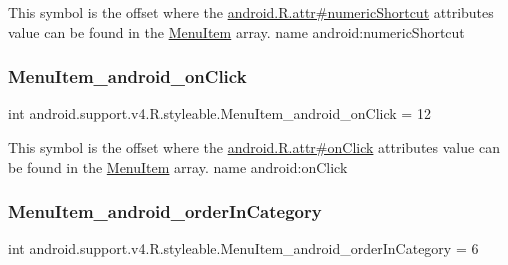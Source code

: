 This symbol is the offset where the \hyperlink{}{android.\+R.\+attr\#numeric\+Shortcut} attribute\textquotesingle{}s value can be found in the \hyperlink{classandroid_1_1support_1_1v4_1_1R_1_1styleable_a4234e016636b99c0c3d9cfc512903697}{Menu\+Item} array.  name android\+:numeric\+Shortcut \mbox{\label{classandroid_1_1support_1_1v4_1_1R_1_1styleable_acb8f5023cfce902cf351f49364d68143}} 
\subsubsection{\texorpdfstring{Menu\+Item\+\_\+android\+\_\+on\+Click}{MenuItem\_android\_onClick}}
{\footnotesize\ttfamily int android.\+support.\+v4.\+R.\+styleable.\+Menu\+Item\+\_\+android\+\_\+on\+Click = 12\hspace{0.3cm}{\ttfamily [static]}}

This symbol is the offset where the \hyperlink{}{android.\+R.\+attr\#on\+Click} attribute\textquotesingle{}s value can be found in the \hyperlink{classandroid_1_1support_1_1v4_1_1R_1_1styleable_a4234e016636b99c0c3d9cfc512903697}{Menu\+Item} array.  name android\+:on\+Click \mbox{\label{classandroid_1_1support_1_1v4_1_1R_1_1styleable_ab9d9472a2e90c5fdcf27802d8eb81618}} 
\subsubsection{\texorpdfstring{Menu\+Item\+\_\+android\+\_\+order\+In\+Category}{MenuItem\_android\_orderInCategory}}
{\footnotesize\ttfamily int android.\+support.\+v4.\+R.\+styleable.\+Menu\+Item\+\_\+android\+\_\+order\+In\+Category = 6\hspace{0.3cm}{\ttfamily [static]}}

